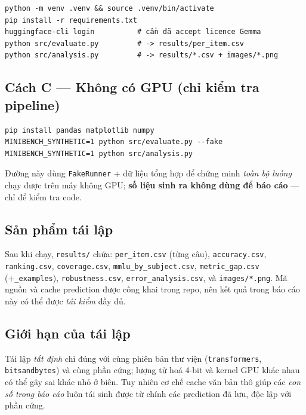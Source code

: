 \begin{verbatim}
python -m venv .venv && source .venv/bin/activate
pip install -r requirements.txt
huggingface-cli login          # cần đã accept licence Gemma
python src/evaluate.py         # -> results/per_item.csv
python src/analysis.py         # -> results/*.csv + images/*.png
\end{verbatim}

\subsection{Cách C --- Không có GPU (chỉ kiểm tra pipeline)}

\begin{verbatim}
pip install pandas matplotlib numpy
MINIBENCH_SYNTHETIC=1 python src/evaluate.py --fake
MINIBENCH_SYNTHETIC=1 python src/analysis.py
\end{verbatim}

Đường này dùng \texttt{FakeRunner} + dữ liệu tổng hợp để chứng minh \emph{toàn bộ
luồng} chạy được trên máy không GPU; \textbf{số liệu sinh ra không dùng để báo cáo}
--- chỉ để kiểm tra code.

\subsection{Sản phẩm tái lập}

Sau khi chạy, \texttt{results/} chứa: \texttt{per\_item.csv} (từng câu),
\texttt{accuracy.csv}, \texttt{ranking.csv}, \texttt{coverage.csv},
\texttt{mmlu\_by\_subject.csv}, \texttt{metric\_gap.csv} (+\texttt{\_examples}),
\texttt{robustness.csv}, \texttt{error\_analysis.csv}, và \texttt{images/*.png}.
Mã nguồn và cache prediction được công khai trong repo, nên kết quả trong báo cáo
này có thể được \emph{tái kiểm} đầy đủ.

\subsection{Giới hạn của tái lập}

Tái lập \emph{tất định} chỉ đúng với cùng phiên bản thư viện (\texttt{transformers},
\texttt{bitsandbytes}) và cùng phần cứng; lượng tử hoá 4-bit và kernel GPU khác nhau
có thể gây sai khác nhỏ ở biên. Tuy nhiên cơ chế cache văn bản thô giúp các \emph{con
số trong báo cáo} luôn tái sinh được từ chính các prediction đã lưu, độc lập với
phần cứng.
